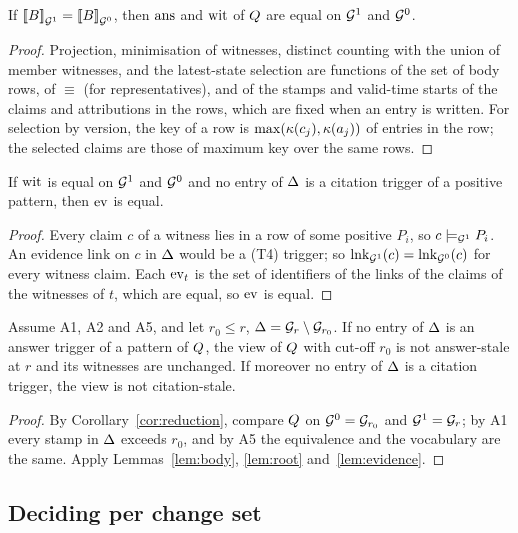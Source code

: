 \begin{lemma}\label{lem:root}
If $[\![B]\!]_{\mathcal G^1}^{}=[\![B]\!]_{\mathcal G^0}^{}$, then $\mathrm{ans}$ and $\mathrm{wit}$ of $Q$ are equal on $\mathcal G^1$ and
$\mathcal G^0$.
\end{lemma}
\begin{proof}
Projection, minimisation of witnesses, distinct counting with the union of member witnesses, and
the latest-state selection are functions of the set of body rows, of $\equiv$ (for
representatives), and of the stamps and valid-time starts of the claims and attributions in the
rows, which are fixed when an entry is written. For selection by version, the key of a row is
$\max(\kappa(c_j),\kappa(a_j))$ of entries in the row; the selected claims are those of maximum key over
the same rows.
\end{proof}

\begin{lemma}[Evidence]\label{lem:evidence}
If $\mathrm{wit}$ is equal on $\mathcal G^1$ and $\mathcal G^0$ and no entry of $\Delta$ is a citation trigger of a positive
pattern, then $\mathrm{ev}$ is equal.
\end{lemma}
\begin{proof}
Every claim $c$ of a witness lies in a row of some positive $P_i$, so $c\models_{\mathcal G^1}P_i$. An
evidence link on $c$ in $\Delta$ would be a (T4) trigger; so $\mathrm{lnk}_{\mathcal G^1}(c)=\mathrm{lnk}_{\mathcal G^0}(c)$ for
every witness claim. Each $\mathrm{ev}_t$ is the set of identifiers of the links of the claims of the
witnesses of $t$, which are equal, so $\mathrm{ev}$ is equal.
\end{proof}

\begin{proposition}\label{prop:s-soundness}
Assume A1, A2 and A5, and let $r_0\le r$, $\Delta=\mathcal G_r\setminus\mathcal G_{r_0}$. If no entry of $\Delta$ is
an answer trigger of a pattern of $Q$, the view of $Q$ with cut-off $r_0$ is not answer-stale at
$r$ and its witnesses are unchanged. If moreover no entry of $\Delta$ is a citation trigger, the
view is not citation-stale.
\end{proposition}
\begin{proof}
By Corollary~\ref{cor:reduction}, compare $Q$ on $\mathcal G^0=\mathcal G_{r_0}$ and $\mathcal G^1=\mathcal G_r$; by A1 every
stamp in $\Delta$ exceeds $r_0$, and by A5 the equivalence and the vocabulary are the same. Apply
Lemmas~\ref{lem:body}, \ref{lem:root} and~\ref{lem:evidence}.
\end{proof}

\subsection{Deciding per change set}

